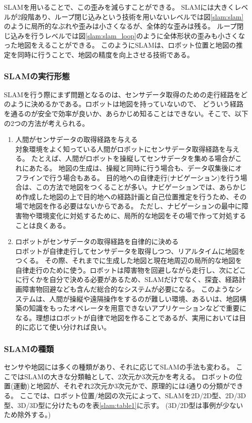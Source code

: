 SLAMを用いることで、この歪みを減らすことができる。
SLAMには大きくレベルが2段階あり、ループ閉じ込みという技術を用いないレベルでは図\ref{slam:slam}のように局所的なぶれや歪みは小さくなるが、全体的な歪みは残る。
ループ閉じ込みを行うレベルでは図\ref{slam:slam_loop}のように全体形状の歪みも小さくなった地図をえることができる。
このようにSLAMは、ロボット位置と地図の推定を同時に行うことで、地図の精度を向上させる技術である。

\clearpage
\subsubsection{SLAMの実行形態}
SLAMを行う際にまず問題となるのは、センサデータ取得のための走行経路をどのように決めるかである。ロボットは地図を持っていないので、
どういう経路を通るのが安全で効率が良いか、あらかじめ知ることはできない。そこで、以下の2つの方法が考えられる。

\begin{enumerate}
  \item 人間がセンサデータの取得経路を与える\\
  対象環境をよく知っている人間がロボットにセンサデータ取得経路を与える。
  たとえば、人間がロボットを操縦してセンサデータを集める場合がこれにあたる。
  地図の生成は、操縦と同時に行う場合も、データ収集後にオフラインで行う場合もある。
  目的地への自律走行(ナビゲーション)を行う場合は、この方法で地図をつくることが多い。ナビゲーションでは、あらかじめ作成した地図の上で目的地への経路計画と自己位置推定を行うため、その場で地図を作る必要はないからである。
  ただし、ナビゲーションの最中に障害物や環境変化に対処するために、局所的な地図をその場で作って対処することは良くある。
  \item ロボットがセンサデータの取得経路を自律的に決める\\
  ロボットが自律走行してセンサデータを取得しつつ、リアルタイムに地図をつくる。
  その際、それまでに生成した地図と現在地周辺の局所的な地図を自律走行のために使う。ロボットは障害物を回避しながら走行し、次にどこに行くかを自分で決める必要があるため、SLAMだけでなく、探査、経路計画障害物回避なども含んだ総合的なシステムが必要になる。
  このようなシステムは、人間が操縦や遠隔操作をするのが難しい環境、あるいは、地図構築の知識をもったオペレータを用意できないアプリケーションなどで重要になる。理想はロボットが自律で地図を作ることであるが、実用においては目的に応じて使い分ければ良い。
\end{enumerate}

\subsubsection{SLAMの種類}
センサや地図には多くの種類があり、それに応じてSLAMの手法も変わる。
ここではSLAMの大きな分類軸として、2次元か3次元かを考える。
ロボットの位置(運動)と地図が、それぞれ2次元か3次元かで、原理的には4通りの分類ができる。
ここでは、ロボット位置/地図の次元によって、SLAMを2D/2D型、2D/3D型、3D/3D型に分けたものを表\ref{slam:table1}に示す。
(3D/2D型は事例が少ないため除外する。)

